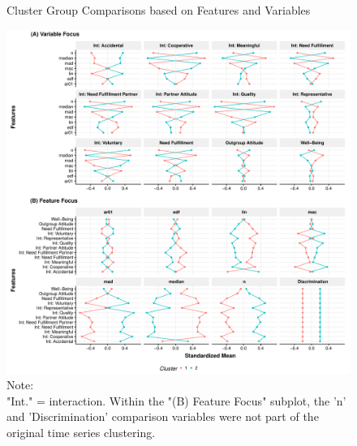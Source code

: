 \begin{figure}[!ht] %
  \caption{Cluster Group Comparisons based on Features and Variables}
  \label{fig:clusterFeatVar}
  \centering\includegraphics[width=\textwidth]{figures/clusterFeatVarComb.pdf}
  \caption*{Note: \\
  "Int." = interaction. Within the "(B) Feature Focus" subplot, the 'n' and 'Discrimination' comparison variables were not part of the original time series clustering.}
\end{figure}

